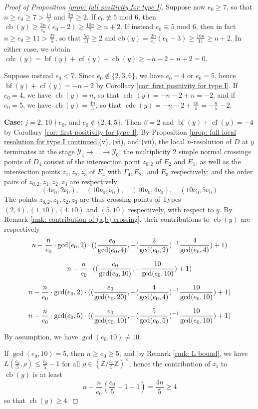 \documentclass[12pt]{amsart}
\numberwithin{equation}{section}
\theoremstyle{definition}
\newcommand{\Z}{\mathbb Z}
\newcommand{\Y}{\mathcal{Y}}
\newcommand{\tx}[1]{\text{#1}}
\let\L\relax
\DeclareMathOperator{\blf}{bf}
\DeclareMathOperator{\cf}{cf}
\DeclareMathOperator{\cb}{cb}
\DeclareMathOperator{\cdc}{cdc}
\DeclareMathOperator{\L}{L}
\begin{document}
\begin{proof}[Proof of Proposition \ref{prop: full positivity for type I}]
    Suppose now $e_0\geq 7$, so that $n\geq e_0\geq 7>\frac{14}{3}$ and $\frac{3n}{7}\geq 2$. If $e_0\not\equiv 5\tx{ mod }6$, then $\cb(y)\geq \frac{2n}{e_0}(e_0-2)\geq \frac{10n}{7}\geq n+2$. If instead $e_0\equiv 5$ mod $6$, then in fact $n\geq e_0\geq 11>\frac{22}{5}$, so that $\frac{5n}{11}\geq 2$ and $\tx{cb}(y)=\frac{2n}{e_0}(e_0-3)\geq\frac{16n}{11}\geq n+2$. In either case, we obtain $\cdc(y)=\blf(y)+\cf(y)+\cb(y)\geq-n-2+n+2=0$.

    Suppose instead $e_0<7$. Since $e_0\not\in\{2,3,6\}$, we have $e_0=4$ or $e_0=5$, hence $\blf(y)+\cf(y)=-n-2$ by Corollary \ref{cor: first positivity for type I}. If $e_0=4$, we have $\cb(y)=n$, so that $\cdc(y)=-n-2+n=-2$, and if $e_0=5$, we have $\cb(y)=\frac{4n}{5}$, so that $\cdc(y)=-n-2+\frac{4n}{5}=-\frac{n}{5}-2$. 

    \textbf{Case:} $j=2$, $10\nmid e_0$, and $e_0\not\in\{2,4,5\}$. Then $\beta=2$ and $\blf(y)+\cf(y)=-4$ by Corollary \ref{cor: first positivity for type I}. By Proposition \ref{prop: full local resolution for type I continued}(v), (vi), and (vii),  the local $n$-resolution of $D$ at $y$ terminates at the stage $\Y_4\to...\to\Y_0$; the multiplicity $2$ simple normal crossings points of $D_4$ consist of the intersection point $z_{0,2}$ of $E_2$ and $E_1$, as well as the intersection points $z_1,z_2,z_3$ of $E_4$ with $\Gamma_4,E_2,$ and $E_3$ respectively; and the order pairs of $z_{0,2},z_1,z_2,z_3$ are respectively
    \[(4\nu_0,2\nu_0),\quad (10\nu_0,\nu_0),\quad (10\nu_0,4\nu_0),\quad (10\nu_0,5\nu_0)\]
    The points $z_{0,2},z_1,z_2,z_3$ are thus crossing points of Types $(2,4),(1,10),(4,10)$ and $(5,10)$ respectively, with respect to $y$. By Remark \ref{rmk: contribution of (a,b) crossing}, their contributions to $\cb(y)$ are respectively
    \[n-\frac{n}{e_0}\cdot\gcd(e_0,2)\cdot(\L(\frac{e_0}{\gcd(e_0,4)},-(\frac{2}{\gcd(e_0,2)})^{-1}\frac{4}{\gcd(e_0,4)})+1)\]

    \[n-\frac{n}{e_0}\cdot(\L(\frac{e_0}{\gcd(e_0,10)},-\frac{10}{\gcd(e_0,10)})+1)\]
    
    \[n-\frac{n}{e_0}\cdot\gcd(e_0,2)\cdot(\L(\frac{e_0}{\gcd(e_0,20)},-(\frac{4}{\gcd(e_0,4)})^{-1}\frac{10}{\gcd(e_0,10)})+1)\]

    \[n-\frac{n}{e_0}\cdot\gcd(e_0,5)\cdot(\L(\frac{e_0}{\gcd(e_0,10)},-(\frac{5}{\gcd(e_0,5)})^{-1}\frac{10}{\gcd(e_0,10)})+1)\]

    By assumption, we have $\gcd(e_0,10)\neq 10$.
    
    If $\gcd(e_0,10)=5$, then $n\geq e_0\geq 5$, and by Remark \ref{rmk: L bound}, we have $L(\frac{e_0}{5},\rho)\leq\frac{e_0}{5}-1$ for all $\rho\in(\Z/\frac{e_0}{5}\Z)^\times$, hence the contribution of $z_1$ %
    to $\cb(y)$ is at least 
    \[n-\frac{n}{e_0}(\frac{e_0}{5}-1+1)=\frac{4n}{5}\geq 4\]
    so that $\cb(y)\geq 4$.
 

\end{proof}
\end{document}
